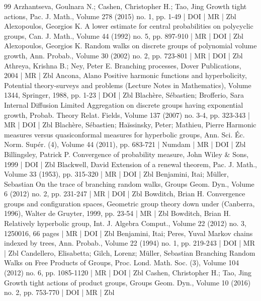 \begin{thebibliography}{99}
 Arzhantseva, Goulnara N.; Cashen, Christopher H.; Tao, Jing Growth tight actions, Pac. J. Math., Volume 278 (2015) no. 1, pp. 1-49 | DOI | MR | Zbl
 Alexopoulos, Georgios K. A lower estimate for central probabilities on polycyclic groups, Can. J. Math., Volume 44 (1992) no. 5, pp. 897-910 | MR | DOI | Zbl
 Alexopoulos, Georgios K. Random walks on discrete groups of polynomial volume growth, Ann. Probab., Volume 30 (2002) no. 2, pp. 723-801 | MR | DOI | Zbl
 Athreya, Krishna B.; Ney, Peter E. Branching processes, Dover Publications, 2004 | MR | Zbl
 Ancona, Alano Positive harmonic functions and hyperbolicity, Potential theory-surveys and problems (Lecture Notes in Mathematics), Volume 1344, Springer, 1988, pp. 1-23 | DOI | Zbl
 Blachère, Sébastien; Brofferio, Sara Internal Diffusion Limited Aggregation on discrete groups having exponential growth, Probab. Theory Relat. Fields, Volume 137 (2007) no. 3-4, pp. 323-343 | MR | DOI | Zbl
 Blachère, Sébastien; Haïssinsky, Peter; Mathieu, Pierre Harmonic measures versus quasiconformal measures for hyperbolic groups, Ann. Sci. Éc. Norm. Supér. (4), Volume 44 (2011), pp. 683-721 | Numdam | MR | DOI | Zbl
 Billingsley, Patrick P. Convergence of probability measure, John Wiley \& Sons, 1999 | DOI | Zbl
 Blackwell, David Extension of a renewal theorem, Pac. J. Math., Volume 33 (1953), pp. 315-320 | MR | DOI | Zbl
 Benjamini, Itai; Müller, Sebastian On the trace of branching random walks, Groups Geom. Dyn., Volume 6 (2012) no. 2, pp. 231-247 | MR | DOI | Zbl
 Bowditch, Brian H. Convergence groups and configuration spaces, Geometric group theory down under (Canberra, 1996), Walter de Gruyter, 1999, pp. 23-54 | MR | Zbl
 Bowditch, Brian H. Relatively hyperbolic group, Int. J. Algebra Comput., Volume 22 (2012) no. 3, 1250016, 66 pages | MR | DOI | Zbl
 Benjamini, Itai; Peres, Yuval Markov chains indexed by trees, Ann. Probab., Volume 22 (1994) no. 1, pp. 219-243 | DOI | MR | Zbl
 Candellero, Elisabetta; Gilch, Lorenz; Müller, Sebastian Branching Random Walks on Free Products of Groups, Proc. Lond. Math. Soc. (3), Volume 104 (2012) no. 6, pp. 1085-1120 | MR | DOI | Zbl
 Cashen, Christopher H.; Tao, Jing Growth tight actions of product groups, Groups Geom. Dyn., Volume 10 (2016) no. 2, pp. 753-770 | DOI | MR | Zbl

\end{thebibliography}
